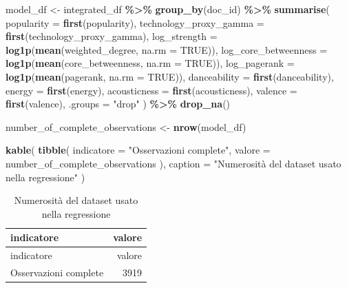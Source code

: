 \documentclass[
]{article}
\newenvironment{Shaded}{\begin{snugshade}}{\end{snugshade}}
\newcommand{\AttributeTok}[1]{\textcolor[rgb]{0.13,0.29,0.53}{#1}}
\newcommand{\ConstantTok}[1]{\textcolor[rgb]{0.56,0.35,0.01}{#1}}
\newcommand{\FunctionTok}[1]{\textcolor[rgb]{0.13,0.29,0.53}{\textbf{#1}}}
\newcommand{\NormalTok}[1]{#1}
\newcommand{\OtherTok}[1]{\textcolor[rgb]{0.56,0.35,0.01}{#1}}
\newcommand{\SpecialCharTok}[1]{\textcolor[rgb]{0.81,0.36,0.00}{\textbf{#1}}}
\newcommand{\StringTok}[1]{\textcolor[rgb]{0.31,0.60,0.02}{#1}}
\begin{document}
\begin{Shaded}
\begin{Highlighting}[]
\NormalTok{model\_df }\OtherTok{\textless{}{-}}\NormalTok{ integrated\_df }\SpecialCharTok{\%\textgreater{}\%}
  \FunctionTok{group\_by}\NormalTok{(doc\_id) }\SpecialCharTok{\%\textgreater{}\%}
  \FunctionTok{summarise}\NormalTok{(}
    \AttributeTok{popularity =} \FunctionTok{first}\NormalTok{(popularity),}
    \AttributeTok{technology\_proxy\_gamma =} \FunctionTok{first}\NormalTok{(technology\_proxy\_gamma),}
    \AttributeTok{log\_strength =} \FunctionTok{log1p}\NormalTok{(}\FunctionTok{mean}\NormalTok{(weighted\_degree, }\AttributeTok{na.rm =} \ConstantTok{TRUE}\NormalTok{)),}
    \AttributeTok{log\_core\_betweenness =} \FunctionTok{log1p}\NormalTok{(}\FunctionTok{mean}\NormalTok{(core\_betweenness, }\AttributeTok{na.rm =} \ConstantTok{TRUE}\NormalTok{)),}
    \AttributeTok{log\_pagerank =} \FunctionTok{log1p}\NormalTok{(}\FunctionTok{mean}\NormalTok{(pagerank, }\AttributeTok{na.rm =} \ConstantTok{TRUE}\NormalTok{)),}
    \AttributeTok{danceability =} \FunctionTok{first}\NormalTok{(danceability),}
    \AttributeTok{energy =} \FunctionTok{first}\NormalTok{(energy),}
    \AttributeTok{acousticness =} \FunctionTok{first}\NormalTok{(acousticness),}
    \AttributeTok{valence =} \FunctionTok{first}\NormalTok{(valence),}
    \AttributeTok{.groups =} \StringTok{"drop"}
\NormalTok{  ) }\SpecialCharTok{\%\textgreater{}\%}
  \FunctionTok{drop\_na}\NormalTok{()}

\NormalTok{number\_of\_complete\_observations }\OtherTok{\textless{}{-}} \FunctionTok{nrow}\NormalTok{(model\_df)}

\FunctionTok{kable}\NormalTok{(}
  \FunctionTok{tibble}\NormalTok{(}
    \AttributeTok{indicatore =} \StringTok{"Osservazioni complete"}\NormalTok{,}
    \AttributeTok{valore =}\NormalTok{ number\_of\_complete\_observations}
\NormalTok{  ),}
  \AttributeTok{caption =} \StringTok{"Numerosità del dataset usato nella regressione"}
\NormalTok{)}
\end{Highlighting}
\end{Shaded}

\begin{longtable}[]{@{}lr@{}}
\caption{Numerosità del dataset usato nella regressione}\tabularnewline
\toprule\noalign{}
indicatore & valore \\
\midrule\noalign{}
\endfirsthead
\toprule\noalign{}
indicatore & valore \\
\midrule\noalign{}
\endhead
\bottomrule\noalign{}
\endlastfoot
Osservazioni complete & 3919 \\
\end{longtable}
\end{document}
